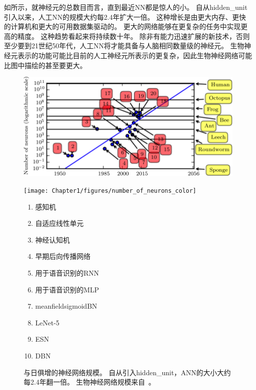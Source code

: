 如所示，就神经元的总数目而言，直到最近\gls{NN}都是惊人的小。
自从\gls{hidden_unit}引入以来，人工\gls{NN}的规模大约每2.4年扩大一倍。
这种增长是由更大内存、更快的计算机和更大的可用数据集驱动的。
更大的网络能够在更复杂的任务中实现更高的精度。
这种趋势看起来将持续数十年。
除非有能力迅速扩展的新技术，否则至少要到21世纪50年代，人工\gls{NN}将才能具备与人脑相同数量级的神经元。
生物神经元表示的功能可能比目前的人工神经元所表示的更复杂，因此生物神经网络可能比图中描绘的甚至要更大。

\begin{figure}[!htb]
\ifOpenSource
\centerline{\includegraphics[scale=0.5]{images/11.png}}
\else
\centerline{\texttt{[image: Chapter1/figures/number\_of\_neurons\_color]}}
\fi
\caption{与日俱增的神经网络规模。
自从引入\gls{hidden_unit}，\gls{ANN}的大小大约每2.4年翻一倍。
生物神经网络规模来自~\citet{number_of_neurons}。
}
\label{fig:chap1_number_of_neurons_color}
{\tiny
\begin{enumerate}
  \itemsep-.1em
  \item %
    感知机~\citep{Rosenblatt-1958,Rosenblatt-1962}
  \item %
    自适应线性单元~\citep{Widrow60}
  \item %
    神经认知机~\citep{Fukushima80}
  \item %
    早期后向传播网络~\citep{Rumelhart86c}
  \item %
    用于语音识别的\gls{RNN}~\citep{Robinson+Fallside91}
  \item %
    用于语音识别的\gls{MLP}~\citep{Bengio91z}
  \item %
    \gls{meanfield}sigmoid\gls{BN}~\citep{Saul+96}
  \item %
    LeNet-5~\citep{LeCun98-small}
  \item %
    \gls{ESN}~\citep{Jaeger+Haas-2004}
  \item %
    \gls{DBN}~\citep{Hinton06}

\end{enumerate}}
\end{figure}
